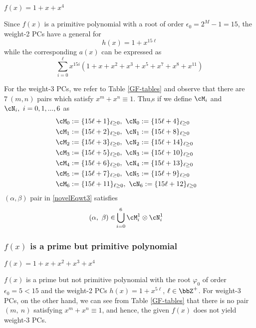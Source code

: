 \begin{example}	$f(x)= 1+x+x^4~$
	
	Since $f(x)$ is a primitive polynomial with a root of order $\epsilon_0=2^M-1=15$, the weight-2 PCs have a general for
	$$h(x)=1+x^{15\ell}$$
	while the corresponding $a(x)$ can be expressed as 
	$$ \sum_{i=0}^{\ell} x^{15i} \left(1 +x +x^2 +x^3+x^5+x^7+x^8+x^{11} \right)$$
	
	For the weight-3 PCs, we refer to Table \ref{GF-tables} and observe that there are $7~(m,n)$ pairs which satisfy $x^m+x^n \equiv 1$. Thu,s if we define $\cM_i$ and $\cN_i,~i=0,1,...,6$ as
	\begin{align}
	\cM_0 &:= \{15\ell + 1\}_{\ell \geq 0},~\cN_0 := \{15\ell + 4\}_{\ell \geq 0}\cr
	\cM_1 &:= \{15\ell + 2\}_{\ell \geq 0},~\cN_1 := \{15\ell + 8\}_{\ell \geq 0}\cr
	\cM_2 &:= \{15\ell + 3\}_{\ell \geq 0},~\cN_2 := \{15\ell + 14\}_{\ell \geq 0}\cr
	\cM_3 &:= \{15\ell + 5\}_{\ell \geq 0},~\cN_3 := \{15\ell + 10\}_{\ell \geq 0}\cr
	\cM_4 &:= \{15\ell + 6\}_{\ell \geq 0},~\cN_4 := \{15\ell + 13\}_{\ell \geq 0}\cr
	\cM_5 &:= \{15\ell + 7\}_{\ell \geq 0},~\cN_5 := \{15\ell + 9\}_{\ell \geq 0}\cr
	\cM_6 &:= \{15\ell + 11\}_{\ell \geq 0},~\cN_6 := \{15\ell + 12\}_{\ell \geq 0}
	\end{align}
	$(\alpha, \beta)$ pair in \eqref{novelEqwt3} satisfies
	\begin{equation*}
	\begin{split}
	(\alpha,~\beta) \in &\bigcup_{i=0}^6 \cM_i^1\otimes\cN_i^1 
	\end{split}
	\end{equation*}
	\label{Ex:2}	
\end{example}

\subsubsection{$f(x)$ is a prime but primitive polynomial}

\begin{example}
$f(x)=1+x+x^2+x^3+x^4$

$f(x)$ is a prime but not primitive polynomial with the root $\varphi_0$ of order $\epsilon_0=5< 15$ and the weight-2 PCs $h(x)=1+x^{5\ell}$, $\ell \in \bbZ^+$. For weight-3 PCs, on the other hand, we can see from Table \ref{GF-tables} that there is no pair $(m,~n)$ satisfying $x^m+x^n \equiv 1$, and hence, the given $f(x)$ does not yield weight-3 PCs.
\label{Ex:3}
\end{example}

